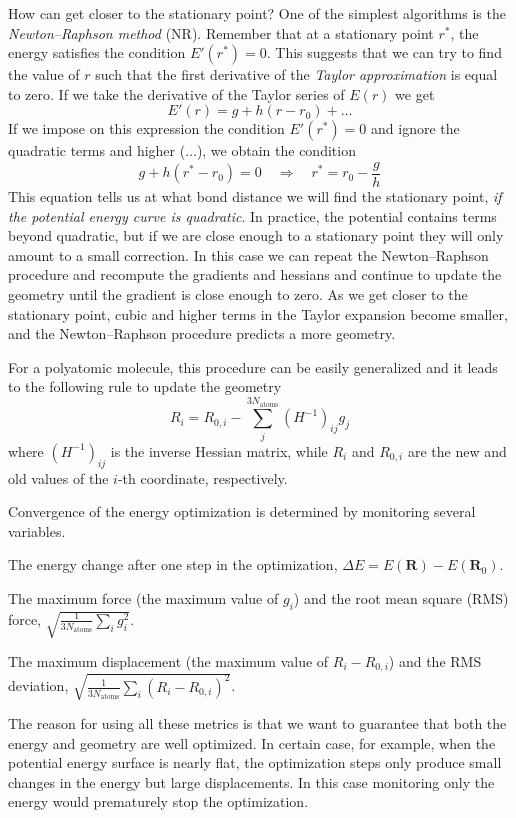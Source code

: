 \documentclass[../Main/notes.tex]{subfiles}
\begin{document}
How can get closer to the stationary point?
One of the simplest algorithms is the \emph{Newton--Raphson method} (NR).
Remember that at a stationary point $r^*$, the energy satisfies the condition $E'(r^*) = 0$. This suggests that we can try to find the value of $r$ such that the first derivative of the \emph{Taylor approximation} is equal to zero.
If we take the derivative of the Taylor series of $E(r)$ we get
\begin{equation}
E'(r)  = g + h (r - r_0) + \ldots 
\end{equation}
If we impose on this expression the condition $E'(r^*) = 0$ and ignore the quadratic terms and higher ($\ldots$), we obtain the condition
\begin{equation}
g + h ( r^* - r_0) = 0 \quad \Rightarrow 
\quad 
r^* = r_0 - \frac{g}{h}
\end{equation}
This equation tells us at what bond distance we will find the stationary point, \emph{if the potential energy curve is quadratic}. In practice, the potential contains terms beyond quadratic, but if we are close enough to a stationary point they will only amount to a small correction.
In this case we can repeat the Newton--Raphson procedure and recompute the gradients and hessians and continue to update the geometry until the gradient is close enough to zero.
As we get closer to the stationary point, cubic and higher terms in the Taylor expansion become smaller, and the Newton--Raphson procedure predicts a more geometry.

For a polyatomic molecule, this procedure can be easily generalized and it leads to the following rule to update the geometry
\begin{equation}
R_i = R_{0,i} - \sum_{j}^{3 N_\mathrm{atoms}}(H^{-1})_{ij} g_j
\end{equation}
where $(H^{-1})_{ij}$ is the inverse Hessian matrix, while $R_i$ and $R_{0,i}$ are the new and old values of the $i$-th coordinate, respectively.

Convergence of the energy optimization is determined by monitoring several variables.
\begin{myitems}
\item The energy change after one step in the optimization, $\Delta E = E(\mathbf{R}) - E(\mathbf{R}_0)$.
\item The maximum force (the maximum value of $g_i$) and the root mean square (RMS) force, $\sqrt{\frac{1}{3 N_\mathrm{atoms}}\sum_i g_i^2}$.
\item The maximum displacement (the maximum value of $R_i - R_{0,i}$) and the RMS deviation, $\sqrt{\frac{1}{3 N_\mathrm{atoms}}\sum_i (R_i - R_{0,i})^2}$.
\end{myitems}
The reason for using all these metrics is that we want to guarantee that both the energy and geometry are well optimized.
In certain case, for example, when the potential energy surface is nearly flat, the optimization steps only produce small changes in the energy but large displacements.
In this case monitoring only the energy would prematurely stop the optimization.
\end{document}
